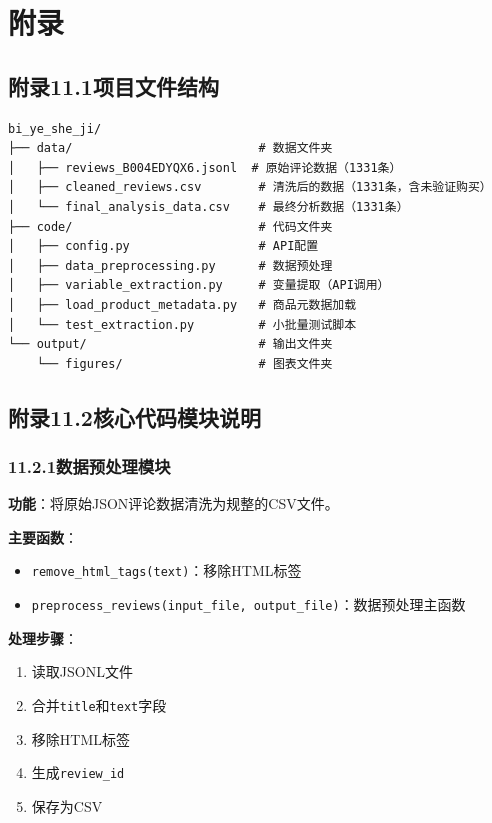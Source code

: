 \section*{附录}

\subsection*{附录11.1\quad 项目文件结构}

\begin{verbatim}
bi_ye_she_ji/
├── data/                          # 数据文件夹
│   ├── reviews_B004EDYQX6.jsonl  # 原始评论数据（1331条）
│   ├── cleaned_reviews.csv        # 清洗后的数据（1331条，含未验证购买）
│   └── final_analysis_data.csv    # 最终分析数据（1331条）
├── code/                          # 代码文件夹
│   ├── config.py                  # API配置
│   ├── data_preprocessing.py      # 数据预处理
│   ├── variable_extraction.py     # 变量提取（API调用）
│   ├── load_product_metadata.py   # 商品元数据加载
│   └── test_extraction.py         # 小批量测试脚本
└── output/                        # 输出文件夹
    └── figures/                   # 图表文件夹
\end{verbatim}

\subsection*{附录11.2\quad 核心代码模块说明}

\subsubsection*{11.2.1\quad 数据预处理模块}

\textbf{功能}：将原始JSON评论数据清洗为规整的CSV文件。

\textbf{主要函数}：
\begin{itemize}
  \item \texttt{remove\_html\_tags(text)}：移除HTML标签
  \item \texttt{preprocess\_reviews(input\_file, output\_file)}：数据预处理主函数
\end{itemize}

\textbf{处理步骤}：
\begin{enumerate}
  \item 读取JSONL文件
  \item 合并\texttt{title}和\texttt{text}字段
  \item 移除HTML标签
  \item 生成\texttt{review\_id}
  \item 保存为CSV
\end{enumerate}

